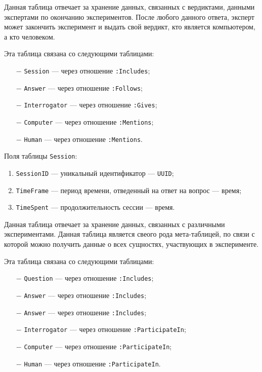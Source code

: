Данная таблица отвечает за хранение данных, связанных с вердиктами, данными экспертами по окончанию экспериментов.
После любого данного ответа, эксперт может закончить эксперимент и выдать свой вердикт, кто является компьютером, а кто человеком.

Эта таблица связана со следующими таблицами:
\begin{itemize}
    \item[$-$] \texttt{Session} --- через отношение \texttt{:Includes};
    \item[$-$] \texttt{Answer} --- через отношение \texttt{:Follows};
    \item[$-$] \texttt{Interrogator} --- через отношение \texttt{:Gives};
    \item[$-$] \texttt{Computer} --- через отношение \texttt{:Mentions};
    \item[$-$] \texttt{Human} --- через отношение \texttt{:Mentions}.
\end{itemize}

Поля таблицы \texttt{Session}:
\begin{enumerate}
    \item \texttt{SessionID} --- уникальный идентификатор --- \texttt{UUID};
    \item \texttt{TimeFrame} --- период времени, отведенный на ответ на вопрос --- время;
    \item \texttt{TimeSpent} --- продолжительность сессии --- время.
\end{enumerate}

Данная таблица отвечает за хранение данных, связанных с различными экспериментами.
Данная таблица является свеого рода мета-таблицей, по связи с которой можно получить данные о всех сущностях, участвующих в эксперименте.

Эта таблица связана со следующими таблицами:
\begin{itemize}
    \item[$-$] \texttt{Question} --- через отношение \texttt{:Includes};
    \item[$-$] \texttt{Answer} --- через отношение \texttt{:Includes};
    \item[$-$] \texttt{Answer} --- через отношение \texttt{:Includes};
    \item[$-$] \texttt{Interrogator} --- через отношение \texttt{:ParticipateIn};
    \item[$-$] \texttt{Computer} --- через отношение \texttt{:ParticipateIn};
    \item[$-$] \texttt{Human} --- через отношение \texttt{:ParticipateIn}.
\end{itemize}

